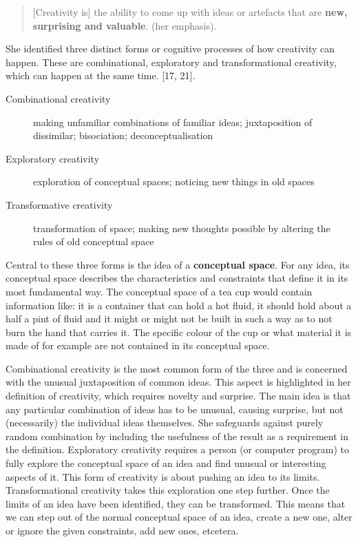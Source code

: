 \begin{quote}
  [Creativity is] the ability to come up with ideas or artefacts that are \textbf{new, surprising and valuable}. \autocite{Boden2003} (her emphasis).
\end{quote}

She identified three distinct forms or cognitive processes of how creativity can happen. These are combinational, exploratory and transformational creativity, which can happen at the same time. \autocite{Boden2003}[17, 21].

\begin{description}
  \item [Combinational creativity] making unfamiliar combinations of familiar ideas; juxtaposition of dissimilar; bisociation; deconceptualisation
  \item [Exploratory creativity] exploration of conceptual spaces; noticing new things in old spaces
  \item [Transformative creativity] transformation of space; making new thoughts possible by altering the rules of old conceptual space
\end{description}

Central to these three forms is the idea of a \textbf{conceptual space}. For any idea, its conceptual space describes the characteristics and constraints that define it in its most fundamental way. The conceptual space of a tea cup would contain information like: it is a container that can hold a hot fluid, it should hold about a half a pint of fluid and it might or might not be built in such a way as to not burn the hand that carries it. The specific colour of the cup or what material it is made of for example are not contained in its conceptual space.

Combinational creativity is the most common form of the three and is concerned with the unusual juxtaposition of common ideas. This aspect is highlighted in her definition of creativity, which requires novelty and surprise. The main idea is that any particular combination of ideas has to be unusual, causing surprise, but not (necessarily) the individual ideas themselves. She safeguards against purely random combination by including the usefulness of the result as a requirement in the definition. Exploratory creativity requires a person (or computer program) to fully explore the conceptual space of an idea and find unusual or interesting aspects of it. This form of creativity is about pushing an idea to its limits. Transformational creativity takes this exploration one step further. Once the limits of an idea have been identified, they can be transformed. This means that we can step out of the normal conceptual space of an idea, create a new one, alter or ignore the given constraints, add new ones, etcetera.

